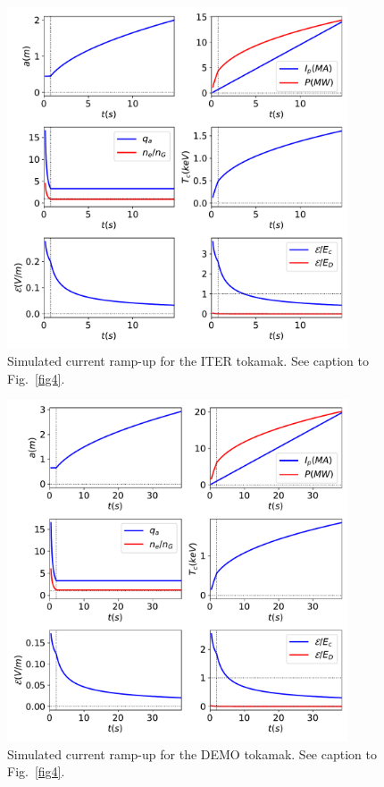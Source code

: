 \documentclass{iopjournal}
\begin{document}
\begin{figure}
\centerline{\includegraphics[width=0.9\textwidth]{Figure6.pdf}}
\caption{Simulated current ramp-up for the ITER tokamak. See caption to Fig.~\ref{fig4}.}\label{fig6}
\end{figure}

\begin{figure}
\centerline{\includegraphics[width=0.9\textwidth]{Figure7.pdf}}
\caption{Simulated current ramp-up for the DEMO tokamak. See caption to Fig.~\ref{fig4}.}\label{fig7}
\end{figure}
\end{document}
